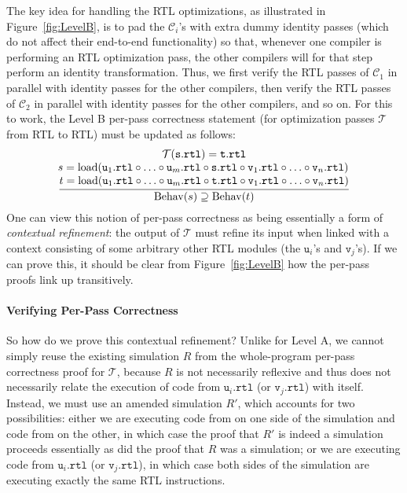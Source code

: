The key idea for handling the RTL optimizations, as illustrated in
Figure~\ref{fig:LevelB}, is to pad the $\mathcal{C}_i$'s with extra
dummy identity passes (which do not affect their end-to-end
functionality) so that, whenever one compiler is performing an RTL
optimization pass, the other compilers will for that step perform an
identity transformation.  Thus, we first verify the RTL passes of
$\mathcal{C}_1$ in parallel with identity passes for the other
compilers, then verify the RTL passes of $\mathcal{C}_2$ in parallel
with identity passes for the other compilers, and so on.  For this to
work, the Level B per-pass correctness statement (for optimization
passes $\mathcal{T}$ from RTL to RTL) must be updated as follows:
\[
\frac{
\begin{array}{@{}c@{}}
\mathcal{T}(\mathtt{s.rtl}) = \mathtt{t.rtl} \\
\!s = \mathrm{load}(\mathtt{u}_1\mathtt{.rtl}\circ \ldots \circ \mathtt{u}_m\mathtt{.rtl}\circ\mathtt{s.rtl} \circ \mathtt{v}_1\mathtt{.rtl}\circ \ldots \circ \mathtt{v}_n\mathtt{.rtl})\\
t = \mathrm{load}(\mathtt{u}_1\mathtt{.rtl}\circ \ldots \circ \mathtt{u}_m\mathtt{.rtl}\circ\mathtt{t.rtl}\circ \mathtt{v}_1\mathtt{.rtl}\circ \ldots \circ \mathtt{v}_n\mathtt{.rtl})
\end{array}
}
{
\mathrm{Behav}(s) 
\supseteq \mathrm{Behav}(t)
}
\]
One can view this notion of per-pass correctness as being essentially
a form of \emph{contextual refinement}: the output of $\mathcal{T}$
must refine its input when linked with a context consisting of some
arbitrary other RTL modules (the $\mathtt{u}_i$'s and
$\mathtt{v}_j$'s).  If we can prove this, it should be clear from
Figure~\ref{fig:LevelB} how the per-pass proofs link up transitively.

\paragraph{Verifying Per-Pass Correctness}

So how do we prove this contextual refinement?  Unlike for Level A, we
cannot simply reuse the existing simulation $R$ from the whole-program
per-pass correctness proof for $\mathcal{T}$, because $R$ is not
necessarily reflexive and thus does not necessarily relate the
execution of code from $\mathtt{u}_i\mathtt{.rtl}$ (or
$\mathtt{v}_j\mathtt{.rtl}$) with itself.  Instead, we must use an
amended simulation $R'$, which accounts for two possibilities: either
we are executing code from  on one side of the simulation and
code from  on the other, in which case the proof that $R'$ is
indeed a simulation proceeds essentially as did the proof that $R$
was a simulation; or we are executing code from
$\mathtt{u}_i\mathtt{.rtl}$ (or $\mathtt{v}_j\mathtt{.rtl}$), in which
case both sides of the simulation are executing exactly the same
RTL instructions.

